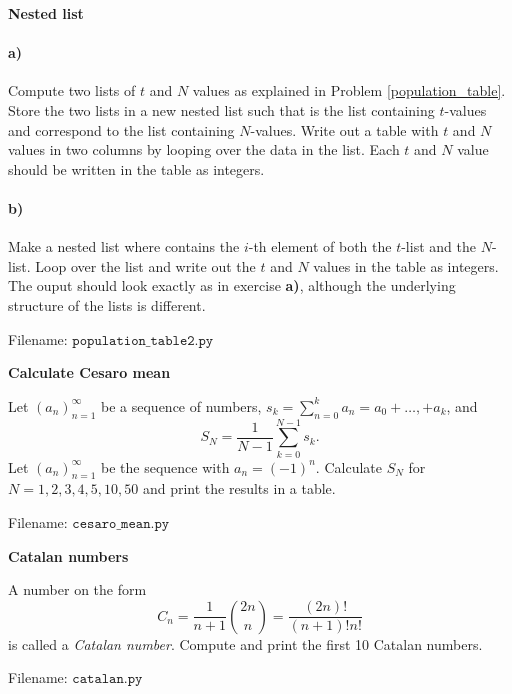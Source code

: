 \begin{Problem}{\textbf{Nested list}}\label{population_table2}

\paragraph{a)} Compute two lists of $t$ and $N$ values as explained in Problem
\ref{population_table}. Store the two lists in a new nested list  such that
 is the list containing $t$-values and  correspond to the list containing $N$-values. Write out a table
with $t$ and $N$ values in two columns by looping over the data in the 
list. Each $t$ and $N$ value should be written in the table as integers.

\paragraph{b)} Make a nested list  where 
contains the $i$-th element of both the $t$-list and the $N$-list. Loop over the  list and write out the $t$ and $N$
values in the table as integers. The ouput should look exactly as in exercise
\textbf{a)}, although the underlying structure of the lists is different.

Filename: $\texttt{population\_table2.py}$
\end{Problem}

\begin{Problem}{\textbf{Calculate Cesaro mean}}

\noindent Let $(a_n)_{n=1}^\infty$ be a sequence of numbers, $s_k=\sum_{n=0}^k a_n=a_0+\dots,+a_k$,
and
\begin{equation*}
    S_N = \frac{1}{N-1}\sum_{k=0}^{N-1} s_k.
\end{equation*}
Let $(a_n)_{n=1}^\infty$ be the sequence with $a_n=(-1)^n$.
Calculate $S_N$ for \newline $N=1, 2, 3, 4, 5, 10, 50$ and print the results in a table.

Filename: $\texttt{cesaro\_mean.py}$
\end{Problem}

\begin{Problem}{\textbf{Catalan numbers}}

\noindent A number on the form
\begin{equation*}
    C_n=\frac{1}{n+1}\binom{2n}{n}=\frac{(2n)!}{(n+1)!n!}
\end{equation*}
is called a \emph{Catalan number}. Compute and print the first 10 Catalan numbers.

Filename: $\texttt{catalan.py}$
\end{Problem}

